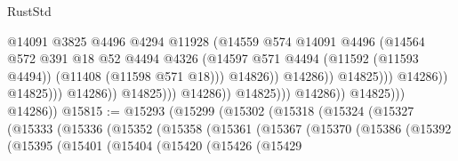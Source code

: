 \begin{lexlean}{RustStd}
\begin{coremodule}
                                                          @14091
                                                          @3825
                                                          @4496
                                                          @4294
                                                          @11928
                                                          (@14559
                                                            @574
                                                            @14091
                                                            @4496
                                                            (@14564
                                                              @572
                                                              @391
                                                              @18
                                                              @52
                                                              @4494
                                                              @4326
                                                              (@14597
                                                                @571
                                                                @4494
                                                                (@11592 (@11593 @4494))
                                                                (@11408 (@11598 @571 @18)))
                                                              @14826))
                                                          @14286))
                                                      @14825)))
                                                @14286))
                                            @14825)))
                                      @14286))
                                  @14825)))
                            @14286))
                        @14825)))
                  @14286))
              @14825)))
        @14286))
@15815 := @15293
    (@15299
      (@15302
        (@15318
          (@15324
            (@15327
              (@15333
                (@15336
                  (@15352
                    (@15358
                      (@15361
                        (@15367
                          (@15370
                            (@15386
                              (@15392
                                (@15395
                                  (@15401
                                    (@15404
                                      (@15420
                                        (@15426
                                          (@15429

\end{coremodule}
\end{lexlean}
